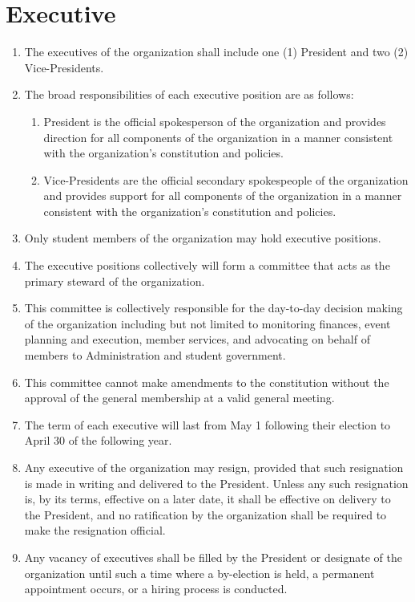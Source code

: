 \documentclass[12pt]{article}
\begin{document}
\section{Executive}
\begin{enumerate}[{4}.1]
    \item The executives of the organization shall include one (1) President and two (2) Vice-Presidents.
    \item The broad responsibilities of each executive position are as follows:
    \begin{enumerate}[{4.2}.1]
        \item	President is the official spokesperson of the organization and provides direction for all components of the organization in a manner consistent with the organization’s constitution and policies.
        \item	Vice-Presidents are the official secondary spokespeople of the organization and provides support for all components of the organization in a manner consistent with the organization’s constitution and policies.
    \end{enumerate}
    \item Only student members of the organization may hold executive positions. 
    \item The executive positions collectively will form a committee that acts as the primary steward of the organization.
    \item This committee is collectively responsible for the day-to-day decision making of the organization including but not limited to monitoring finances, event planning and execution, member services, and advocating on behalf of members to Administration and student government. 
    \item This committee cannot make amendments to the constitution without the approval of the general membership at a valid general meeting. 
    \item The term of each executive will last from May 1 following their election to April 30 of the following year.
    \item Any executive of the organization may resign, provided that such resignation is made in writing and delivered to the President. Unless any such resignation is, by its terms, effective on a later date, it shall be effective on delivery to the President, and no ratification by the organization shall be required to make the resignation official.
    \item Any vacancy of executives shall be filled by the President or designate of the organization until such a time where a by-election is held, a permanent appointment occurs, or a hiring process is conducted. 

\end{enumerate}
\end{document}
